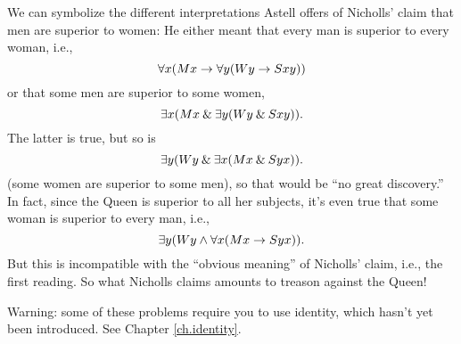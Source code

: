 We can symbolize the different interpretations Astell offers of
Nicholls' claim that men are superior to women:
He either meant that every man is superior to every woman, i.e.,
\[
\forall x(Mx \rightarrow \forall y(Wy \rightarrow Sxy))
\]
or that some men are superior to some women,
\[
\exists x(Mx \mathbin{\&} \exists y(Wy \mathbin{\&} Sxy)).
\]
The latter is true, but so is
\[
\exists y(Wy \mathbin{\&} \exists x(Mx \mathbin{\&} Syx)).
\]
(some women are superior to some men), so that would be ``no great
discovery.''  In fact, since the Queen is superior to all her
subjects, it's even true that some woman is superior to every man,
i.e.,
\[
\exists y(Wy \land \forall x(Mx \rightarrow Syx)).
\]
But this is incompatible with the ``obvious meaning'' of Nicholls'
claim, i.e., the first reading. So what Nicholls claims amounts to
treason against the Queen!

\practiceproblems
\solutions
Warning: some of these problems require you to use identity, which hasn't yet been introduced. See Chapter \ref{ch.identity}.

